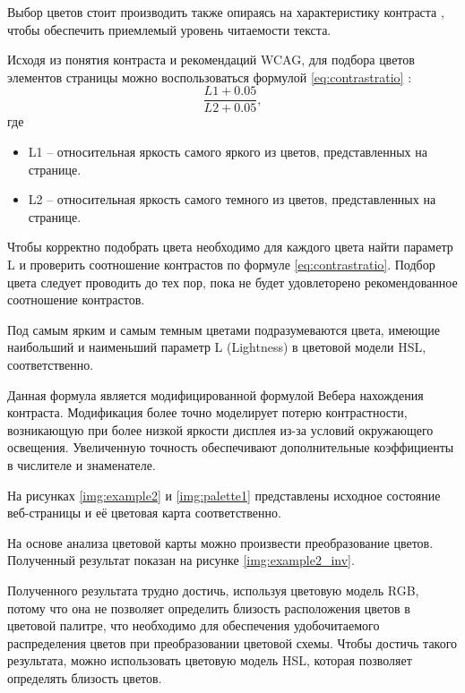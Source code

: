 Выбор цветов стоит производить также опираясь на характеристику контраста \cite{contrast}, чтобы обеспечить приемлемый уровень читаемости текста.

Исходя из понятия контраста и рекомендаций WCAG, для подбора цветов элементов страницы можно воспользоваться формулой  \ref{eq:contrastratio} \cite{wcagcontrast}:
\begin{equation}
	\label{eq:contrastratio}
	\frac{L1 + 0.05}{L2 + 0.05},
\end{equation}
где
\begin{itemize}
	\item L1 -- относительная яркость самого яркого из цветов, представленных на странице.
	\item L2 -- относительная яркость самого темного из цветов, представленных на странице.
\end{itemize}

Чтобы корректно подобрать цвета необходимо для каждого цвета найти параметр L и проверить соотношение контрастов по формуле \ref{eq:contrastratio}. Подбор цвета следует проводить до тех пор, пока не будет удовлеторено рекомендованное соотношение контрастов.

Под самым ярким и самым темным цветами подразумеваются цвета, имеющие наибольший и наименьший параметр L (Lightness) в цветовой модели HSL, соответственно.

Данная формула является модифицированной формулой Вебера \cite{weber} нахождения контраста. Модификация более точно моделирует потерю контрастности, возникающую при более низкой яркости дисплея из-за условий окружающего освещения. Увеличенную точность обеспечивают дополнительные коэффициенты в числителе и знаменателе.

На рисунках \ref{img:example2} и \ref{img:palette1} представлены исходное состояние веб-страницы и её цветовая карта соответственно.




На основе анализа цветовой карты можно произвести преобразование цветов. Полученный результат показан на рисунке \ref{img:example2_inv}.


Полученного результата трудно достичь, используя цветовую модель RGB, потому что она не позволяет определить близость расположения цветов в цветовой палитре, что необходимо для обеспечения удобочитаемого распределения цветов при преобразовании цветовой схемы. Чтобы достичь такого результата, можно использовать цветовую модель HSL, которая позволяет определять близость цветов.

